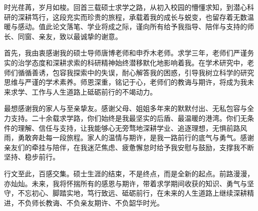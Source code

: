 
\begin{acknowledgements}

时光荏苒，岁月如梭。回首三载硕士求学之路，从初入校园的懵懂求知，到潜心科研的深耕笃行，这段充实而珍贵的旅程，承载着我的成长与蜕变，也留存着无数温暖与感动。值此论文落笔、学业将成之际，谨向所有给予我指导、陪伴与支持的师长、同窗、亲友，致以最诚挚的谢意。

首先，我由衷感谢我的硕士导师唐博老师和申乔木老师。求学三年，老师们严谨务实的治学态度和深耕求索的科研精神始终潜移默化地影响着我。在学术研究中，老师们循循善诱，包容我探索中的失误，耐心解答我的困惑，引导我树立科学的研究思维与严谨的学术素养。师恩深重，铭记于心，老师们的教诲与期许，将成为我未来求学、工作与人生道路上砥砺前行的不竭动力。

最想感谢我的家人与至亲挚友。感谢父母、姐姐多年来的默默付出、无私包容与全力支持。二十余载求学路，你们始终是我最坚实的后盾、最温暖的港湾。你们无条件的理解、信任与支持，让我能够心无旁骛地深耕学业、追逐理想，无惧前路风雨，勇敢奔赴每一段旅程。家人的温情与期许，是我一路前行的底气与勇气。感谢亲友们的牵挂与陪伴，在我迷茫焦虑、疲惫懈怠时给予我安慰与鼓励，支撑我不断坚持、稳步前行。

行文至此，百感交集。硕士生涯的结束，不是终点，而是全新的起点。前路漫漫，亦灿灿。未来，我将怀揣所有的感恩与期许，带着求学期间收获的知识、勇气与坚守，不忘初心、脚踏实地，笃行致远、砥砺前行，在未来的人生道路上继续深耕精进，不负师长教诲、不负亲友期许、不负韶华时光。

\end{acknowledgements}

